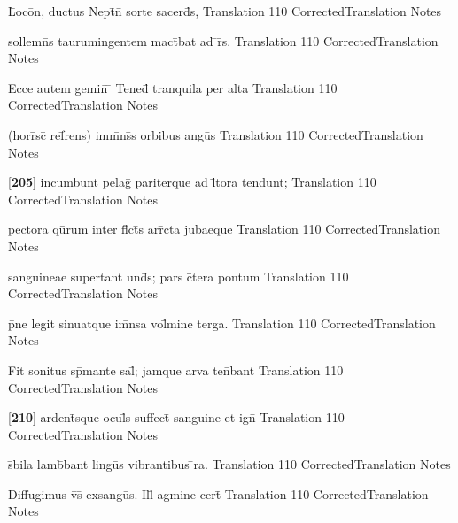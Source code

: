 \latline
  {L\={}oco\={}n, ductus Nept\={}n\={} sorte sacerd\={}s,}
  { Translation }
  {110}
  { CorrectedTranslation }
  { Notes }


\latline
  {sollemn\={\macron {\i}}s taurumingentem mact\={}bat ad \={}r\={}s.}
  { Translation }
  {110}
  { CorrectedTranslation }
  { Notes }


\latline
  {Ecce autem gemin\={\macron {\i}} \={} Tened\={} tranquila per alta}
  { Translation }
  {110}
  { CorrectedTranslation }
  { Notes }


\latline
  {(horr\={}sc\={} ref\={}rens) imm\={}ns\={\macron {\i}}s orbibus angu\={}s}
  { Translation }
  {110}
  { CorrectedTranslation }
  { Notes }


\latline
  {[\textbf{205}] incumbunt pelag\={} pariterque ad l\={\macron {\i}}tora tendunt;}
  { Translation }
  {110}
  { CorrectedTranslation }
  { Notes }


\latline
  {pectora qu\={}rum inter fl\={}ct\={}s arr\={}cta jubaeque}
  { Translation }
  {110}
  { CorrectedTranslation }
  { Notes }


\latline
  {sanguineae supertant und\={}s; pars c\={}tera pontum}
  { Translation }
  {110}
  { CorrectedTranslation }
  { Notes }


\latline
  {p\={}ne legit sinuatque im\={}nsa vol\={}mine terga.}
  { Translation }
  {110}
  { CorrectedTranslation }
  { Notes }


\latline
  {Fit sonitus sp\={}mante sal\={}; jamque arva ten\={}bant }
  { Translation }
  {110}
  { CorrectedTranslation }
  { Notes }


\latline
  {[\textbf{210}] ardent\={\macron {\i}}sque ocul\={}s suffect\={\macron {\i}} sanguine et ign\={\macron {\i}}}
  { Translation }
  {110}
  { CorrectedTranslation }
  { Notes }


\latline
  {s\={\macron {\i}}bila lamb\={}bant lingu\={\macron {\i}}s vibrantibus \={}ra.}
  { Translation }
  {110}
  { CorrectedTranslation }
  { Notes }


\latline
  {Diffugimus v\={\macron {\i}}s\={} exsangu\={}s.  Ill\={\macron {\i}} agmine cert\={}}
  { Translation }
  {110}
  { CorrectedTranslation }
  { Notes }


